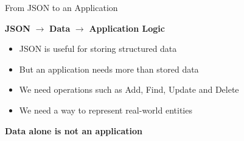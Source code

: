 \begin{frame}{From JSON to an Application}

    \begin{center}
        \Large
        \textbf{JSON}
        $\longrightarrow$
        \textbf{Data}
        $\longrightarrow$
        \textbf{Application Logic}
    \end{center}

    \vspace{0.8cm}

    \begin{itemize}
        \item JSON is useful for storing structured data
        \item But an application needs more than stored data
        \item We need operations such as Add, Find, Update and Delete
        \item We need a way to represent real-world entities
    \end{itemize}

    \vfill

    \begin{center}
        \Large
        \textbf{Data alone is not an application}
    \end{center}

\end{frame}